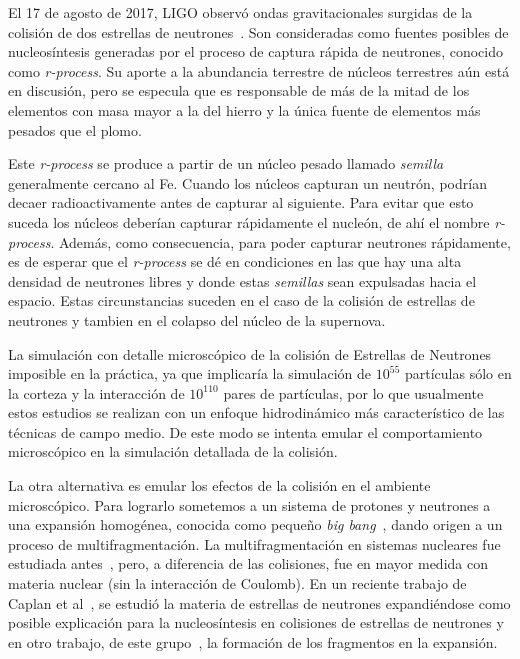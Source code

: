 El 17 de agosto de 2017, LIGO observó ondas gravitacionales surgidas de la colisión de dos estrellas de neutrones~\cite{ligo_scientific_collaboration_and_virgo_collaboration_gw170817:_2017}.
Son consideradas como fuentes posibles de nucleosíntesis generadas por el proceso de captura rápida de neutrones, conocido como \emph{r-process}.
Su aporte a la abundancia terrestre de núcleos terrestres aún está en discusión, pero se especula que es responsable de más de la mitad de los elementos con masa mayor a la del hierro y la única fuente de elementos más pesados que el plomo.

Este \emph{r-process} se produce a partir de un núcleo pesado llamado \emph{semilla} generalmente cercano al Fe.
Cuando los núcleos capturan un neutrón, podrían decaer radioactivamente antes de capturar al siguiente.
Para evitar que esto suceda los núcleos deberían capturar rápidamente el nucleón, de ahí el nombre \emph{r-process}.
Además, como consecuencia, para poder capturar neutrones rápidamente, es de esperar que el \emph{r-process} se dé en condiciones en las que hay una alta densidad de neutrones libres y donde estas \emph{semillas} sean expulsadas hacia el espacio.
Estas circunstancias suceden en el caso de la colisión de estrellas de neutrones y tambien en el colapso del núcleo de la supernova.

La simulación con detalle microscópico de la colisión de Estrellas de Neutrones imposible en la práctica, ya que implicaría la simulación de $10^{55}$ partículas sólo en la corteza y la interacción de $10^{110}$ pares de partículas, por lo que usualmente estos estudios se realizan con un enfoque hidrodinámico más característico de las técnicas de campo medio.
De este modo se intenta emular el comportamiento microscópico en la simulación detallada de la colisión.

La otra alternativa es emular los efectos de la colisión en el ambiente microscópico.
Para lograrlo sometemos a un sistema de protones y neutrones a una expansión homogénea, conocida como pequeño \emph{big bang}~\cite{dorso_onset_1996}, dando origen a un proceso de multifragmentación.
La multifragmentación en sistemas nucleares fue estudiada antes~\cite{bonasera_critical_2000, chikazumi_quantum_2001}, pero, a diferencia de las colisiones, fue en mayor medida con materia nuclear (sin la interacción de Coulomb).
En un reciente trabajo de Caplan et al~\cite{caplan_pasta_2015}, se estudió la materia de estrellas de neutrones expandiéndose como posible explicación para la nucleosíntesis en colisiones de estrellas de neutrones y en otro trabajo, de este grupo~\cite{alcain_dynamics_2017}, la formación de los fragmentos en la expansión.

